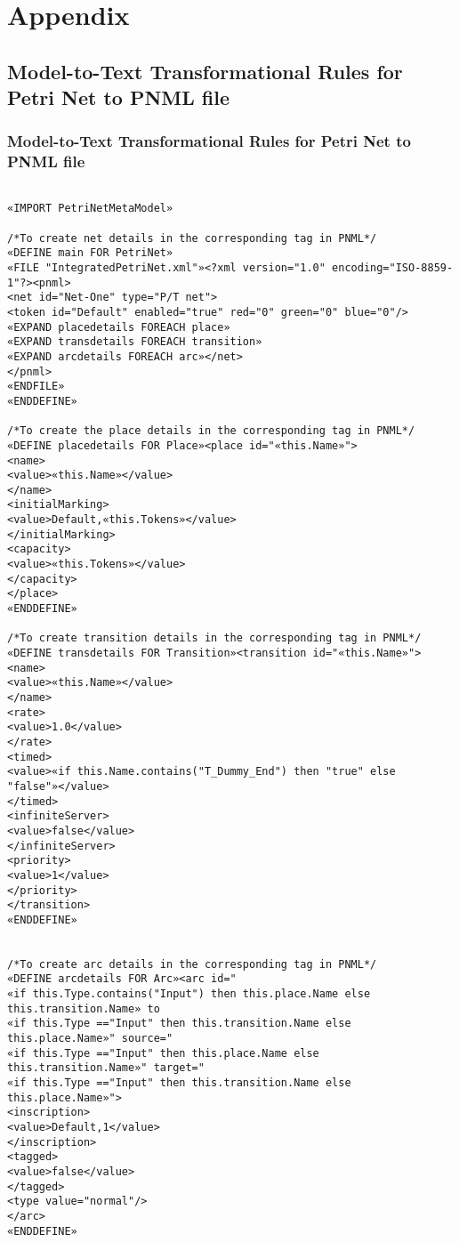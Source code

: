 \chapter{Appendix}


\section{Model-to-Text Transformational Rules for Petri Net to PNML file}
\subsection{Model-to-Text Transformational Rules for Petri Net to PNML file}\label{m2trules}
\begin{verbatim}

«IMPORT PetriNetMetaModel»

/*To create net details in the corresponding tag in PNML*/
«DEFINE main FOR PetriNet»
«FILE "IntegratedPetriNet.xml"»<?xml version="1.0" encoding="ISO-8859-1"?><pnml>
<net id="Net-One" type="P/T net">
<token id="Default" enabled="true" red="0" green="0" blue="0"/>
«EXPAND placedetails FOREACH place»
«EXPAND transdetails FOREACH transition»
«EXPAND arcdetails FOREACH arc»</net>
</pnml>
«ENDFILE»	
«ENDDEFINE»

/*To create the place details in the corresponding tag in PNML*/
«DEFINE placedetails FOR Place»<place id="«this.Name»">
<name>
<value>«this.Name»</value>
</name>
<initialMarking>
<value>Default,«this.Tokens»</value>
</initialMarking>
<capacity>
<value>«this.Tokens»</value>
</capacity>
</place>
«ENDDEFINE»

/*To create transition details in the corresponding tag in PNML*/
«DEFINE transdetails FOR Transition»<transition id="«this.Name»">
<name>
<value>«this.Name»</value>
</name>
<rate>
<value>1.0</value>
</rate>
<timed>
<value>«if this.Name.contains("T_Dummy_End") then "true" else "false"»</value>
</timed>
<infiniteServer>
<value>false</value>
</infiniteServer>
<priority>
<value>1</value>
</priority>
</transition>
«ENDDEFINE»


/*To create arc details in the corresponding tag in PNML*/
«DEFINE arcdetails FOR Arc»<arc id="
«if this.Type.contains("Input") then this.place.Name else this.transition.Name» to 
«if this.Type =="Input" then this.transition.Name else this.place.Name»" source="
«if this.Type =="Input" then this.place.Name else this.transition.Name»" target="
«if this.Type =="Input" then this.transition.Name else this.place.Name»">
<inscription>
<value>Default,1</value>
</inscription>
<tagged>
<value>false</value>
</tagged>
<type value="normal"/>
</arc>
«ENDDEFINE»
\end{verbatim}

